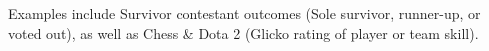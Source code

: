 \documentclass[preview]{standalone}
\begin{document}
Examples include Survivor contestant outcomes (Sole survivor, runner-up, or voted out), as well as Chess \& Dota 2 (Glicko rating of player or team skill).\\
\end{document}
